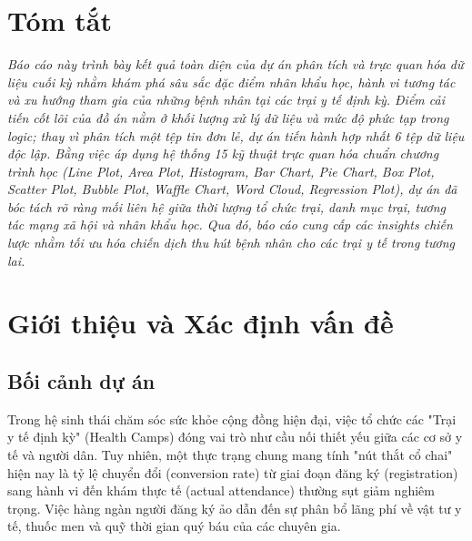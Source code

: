 \documentclass[12pt,a4paper]{article}
\begin{document}
\newpage
\section*{Tóm tắt}
\vspace{0.5cm}
\begin{center}
    \begin{minipage}{0.9\textwidth}
        \noindent
        \textit{Báo cáo này trình bày kết quả toàn diện của dự án phân tích và trực quan hóa dữ liệu cuối kỳ nhằm khám phá sâu sắc đặc điểm nhân khẩu học, hành vi tương tác và xu hướng tham gia của những bệnh nhân tại các trại y tế định kỳ. Điểm cải tiến cốt lõi của đồ án nằm ở khối lượng xử lý dữ liệu và mức độ phức tạp trong logic; thay vì phân tích một tệp tin đơn lẻ, dự án tiến hành hợp nhất 6 tệp dữ liệu độc lập. Bằng việc áp dụng hệ thống 15 kỹ thuật trực quan hóa chuẩn chương trình học (Line Plot, Area Plot, Histogram, Bar Chart, Pie Chart, Box Plot, Scatter Plot, Bubble Plot, Waffle Chart, Word Cloud, Regression Plot), dự án đã bóc tách rõ ràng mối liên hệ giữa thời lượng tổ chức trại, danh mục trại, tương tác mạng xã hội và nhân khẩu học. Qua đó, báo cáo cung cấp các insights chiến lược nhằm tối ưu hóa chiến dịch thu hút bệnh nhân cho các trại y tế trong tương lai.}
    \end{minipage}
\end{center}
\vspace{0.5cm}

\newpage
\tableofcontents
\thispagestyle{empty}
\newpage

\setcounter{page}{1}

\section{Giới thiệu và Xác định vấn đề}

\subsection{Bối cảnh dự án}
Trong hệ sinh thái chăm sóc sức khỏe cộng đồng hiện đại, việc tổ chức các "Trại y tế định kỳ" (Health Camps) đóng vai trò như cầu nối thiết yếu giữa các cơ sở y tế và người dân. Tuy nhiên, một thực trạng chung mang tính "nút thắt cổ chai" hiện nay là tỷ lệ chuyển đổi (conversion rate) từ giai đoạn đăng ký (registration) sang hành vi đến khám thực tế (actual attendance) thường sụt giảm nghiêm trọng. Việc hàng ngàn người đăng ký ảo dẫn đến sự phân bổ lãng phí về vật tư y tế, thuốc men và quỹ thời gian quý báu của các chuyên gia.
\end{document}
